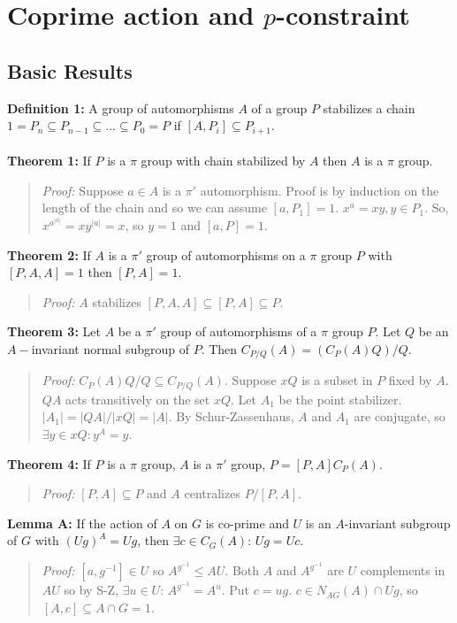 \chapter{Coprime action and $p$-constraint}
\section {Basic Results}
{\bf Definition 1:} A group of automorphisms $A$ of a group $P$ stabilizes a chain
$1=P_n \subseteq P_{n-1} \subseteq \ldots \subseteq P_0 = P$ if
$[A,P_i] \subseteq P_{i+1}$.  
\\
\\
{\bf Theorem 1:} If $P$ is a $\pi$ group with chain stabilized by
$A$ then $A$ is a $\pi$ group.
\begin{quote}
\emph{Proof:} Suppose $a \in A$ is a $\pi'$ automorphism.  Proof is by induction on the
length of the chain and so we can assume $[a,P_1]=1$.
$x^a =xy, y \in P_1$.  So, $x^{a^{|a|}}= x y^{|a|}=x$, so $y=1$ and
$[a,P]=1$.
\end{quote}
{\bf Theorem 2:} If $A$ is a $\pi'$ group of automorphisms on a $\pi$ group $P$ with
$[P,A,A]=1$ then $[P,A]=1$.
\begin{quote}
\emph{Proof:}  $A$ stabilizes
$[P,A,A] \subseteq [P,A] \subseteq P$.
\end{quote}
{\bf Theorem 3:}
Let $A$ be a $\pi'$ group of automorphisms of a $\pi$ group $P$.  Let $Q$ be
an $A-$invariant normal subgroup of $P$.  Then $C_{P/Q}(A)= (C_P(A) Q)/Q$.
\begin{quote}
\emph{Proof:}   $C_P(A)Q/Q \subseteq C_{P/Q}(A)$.  Suppose $xQ$ is a subset in $P$ fixed by
$A$.  $QA$ acts transitively on the set $xQ$.  Let $A_1$ be the point stabilizer.
$|A_1|=|QA|/|xQ|=|A|$.  By Schur-Zassenhaus, $A$ and $A_1$ are conjugate, so $\exists y \in xQ:
y^A=y$.
\end{quote}
{\bf Theorem 4:} If $P$ is a $\pi$ group, $A$ is a $\pi'$ group, $P= [P,A] C_P(A)$.
\begin{quote}
\emph{Proof:}
$[P,A] \subseteq P$ and $A$ centralizes $P/[P,A]$.
\end{quote}
{\bf Lemma A:} If the action of $A$ on $G$ is co-prime and $U$ is an $A$-invariant subgroup of $G$ with
$(Ug)^A=Ug$, then $\exists c \in C_G(A)$: $Ug = Uc$.
\begin{quote}
\emph{Proof:}  $[a, g^{-1}] \in U$ so $A^{g^{-1}} \leq AU$.  Both $A$ and $A^{g^{-1}}$ are $U$ complements in
$AU$ so by S-Z, $\exists u \in U$: $A^{g^{-1}} = A^u$.  Put $c= ug$.  $c \in N_{AG}(A) \cap Ug$, so
$[A,c] \subseteq A \cap G = 1$.
\end{quote}
